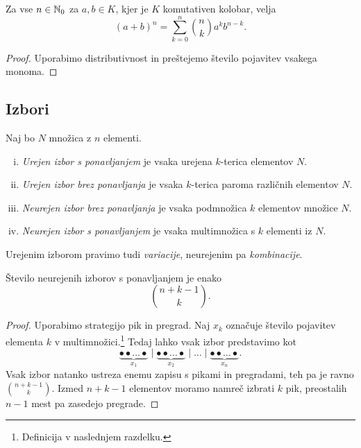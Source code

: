 \begin{izrek}[Binomski]
Za vse $n \in \mathbb{N}_0$ za $a, b \in K$, kjer je $K$ komutativen
kolobar, velja
\[
(a+b)^n = \sum_{k=0}^n \binom{n}{k} a^k b^{n-k}.
\]
\end{izrek}

\begin{proof}
Uporabimo distributivnost in preštejemo število pojavitev vsakega
monoma.
\end{proof}

\newpage

\subsection{Izbori}

\begin{definicija}
Naj bo $N$ množica z $n$ elementi.

\begin{enumerate}[i)]
\item \emph{Urejen izbor s ponavljanjem} je vsaka
urejena $k$-terica elementov $N$.
\item \emph{Urejen izbor brez ponavljanja} je vsaka $k$-terica
paroma različnih elementov $N$.
\item \emph{Neurejen izbor brez ponavljanja} je vsaka podmnožica
$k$ elementov množice $N$.
\item \emph{Neurejen izbor s ponavljanjem} je vsaka multimnožica
s $k$ elementi iz $N$.
\end{enumerate}
\end{definicija}

\begin{opomba}
Urejenim izborom pravimo tudi \emph{variacije}, neurejenim pa
\emph{kombinacije}.
\end{opomba}

\begin{trditev}
Število neurejenih izborov s ponavljanjem je enako
\[
\binom{n+k-1}{k}.
\]
\end{trditev}

\begin{proof}
Uporabimo strategijo pik in pregrad. Naj $x_k$ označuje število
pojavitev elementa $k$ v multimnožici.\footnote{Definicija v
naslednjem razdelku.} Tedaj lahko vsak izbor predstavimo kot
\[
\underbrace{\bullet \bullet \dots \bullet}_{x_1} \mid
\underbrace{\bullet \bullet \dots \bullet}_{x_2} \mid
\dots \mid
\underbrace{\bullet \bullet \dots \bullet}_{x_n}.
\]
Vsak izbor natanko ustreza enemu zapisu s pikami in pregradami, teh
pa je ravno $\binom{n+k-1}{k}$. Izmed $n+k-1$ elementov moramo
namreč izbrati $k$ pik, preostalih $n-1$ mest pa zasedejo pregrade.
\end{proof}


